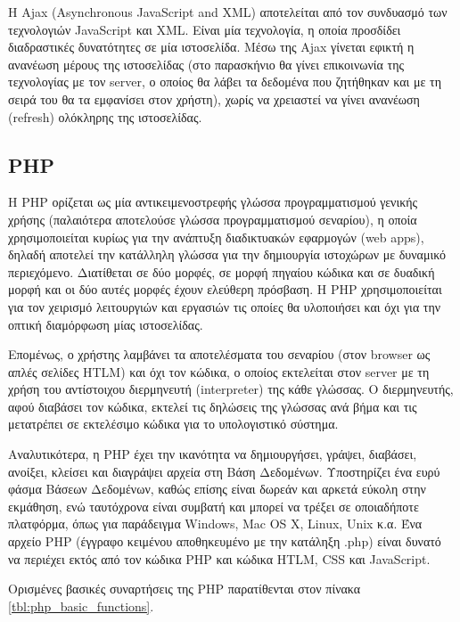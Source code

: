 Η Ajax (Asynchronous JavaScript and XML) αποτελείται από τον συνδυασμό των τεχνολογιών JavaScript και XML. Είναι μία τεχνολογία, η οποία προσδίδει διαδραστικές δυνατότητες σε μία ιστοσελίδα. Μέσω της Ajax γίνεται εφικτή η ανανέωση μέρους της ιστοσελίδας (στο παρασκήνιο θα γίνει επικοινωνία της τεχνολογίας με τον server, ο οποίος θα λάβει τα δεδομένα που ζητήθηκαν και με τη σειρά του θα τα εμφανίσει στον χρήστη), χωρίς να χρειαστεί να γίνει ανανέωση (refresh) ολόκληρης της ιστοσελίδας.

\subsection{PHP}
Η PHP ορίζεται ως μία αντικειμενοστρεφής γλώσσα προγραμματισμού γενικής χρήσης (παλαιότερα αποτελούσε γλώσσα προγραμματισμού σεναρίου), η οποία χρησιμοποιείται κυρίως για την ανάπτυξη διαδικτυακών εφαρμογών (web apps), δηλαδή αποτελεί την κατάλληλη γλώσσα για την δημιουργία ιστοχώρων με δυναμικό περιεχόμενο. Διατίθεται σε δύο μορφές, σε μορφή πηγαίου κώδικα και σε δυαδική μορφή και οι δύο αυτές μορφές έχουν ελεύθερη πρόσβαση. Η PHP χρησιμοποιείται για τον χειρισμό λειτουργιών και εργασιών τις οποίες θα υλοποιήσει και όχι για την οπτική διαμόρφωση μίας ιστοσελίδας.

Επομένως, ο χρήστης λαμβάνει τα αποτελέσματα του σεναρίου (στον browser ως απλές σελίδες HTLM) και όχι τον κώδικα, ο οποίος εκτελείται στον server με τη χρήση του αντίστοιχου διερμηνευτή (interpreter) της κάθε γλώσσας. Ο διερμηνευτής, αφού διαβάσει τον κώδικα, εκτελεί τις δηλώσεις της γλώσσας ανά βήμα και τις μετατρέπει σε εκτελέσιμο κώδικα για το υπολογιστικό σύστημα.

Αναλυτικότερα, η PHP έχει την ικανότητα να δημιουργήσει, γράψει, διαβάσει, ανοίξει, κλείσει και διαγράψει αρχεία στη Βάση Δεδομένων. Υποστηρίζει ένα ευρύ φάσμα Βάσεων Δεδομένων, καθώς επίσης είναι δωρεάν και αρκετά εύκολη στην εκμάθηση, ενώ ταυτόχρονα είναι συμβατή και μπορεί να τρέξει σε οποιαδήποτε πλατφόρμα, όπως για παράδειγμα Windows, Mac OS X, Linux, Unix κ.α. Ένα αρχείο PHP (έγγραφο κειμένου αποθηκευμένο με την κατάληξη .php) είναι δυνατό να περιέχει εκτός από τον κώδικα PHP και κώδικα HTLM, CSS και JavaScript.

Ορισμένες βασικές συναρτήσεις της PHP παρατίθενται στον πίνακα \ref{tbl:php_basic_functions}.

